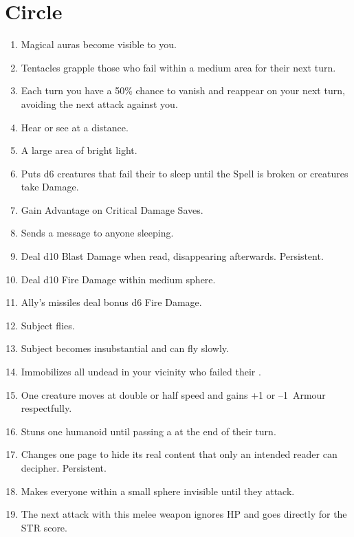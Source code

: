 \documentclass[itdr]{subfiles}
\begin{document}
\section{ Circle}
\begin{enumerate}
	\item {} Magical auras become visible to you.
	\item {} Tentacles grapple those who fail  within a medium area for their next turn.
	\item {} Each turn you have a 50\% chance to vanish and reappear on your next turn, avoiding the next attack against you.
	\item {} Hear or see at a distance.
	\item {} A large area of bright light.
	\item {} Puts d6 creatures that fail their  to sleep until the Spell is broken or creatures take Damage.
	\item {} Gain Advantage on Critical Damage Saves.
	\item {} Sends a message to anyone sleeping.
	\item {} Deal d10 Blast Damage when read, disappearing afterwards. Persistent.
	\item {} Deal d10 Fire Damage within medium sphere.
	\item {} Ally's missiles deal bonus d6 Fire Damage.
	\item {} Subject flies.
	\item {} Subject becomes insubstantial and can fly slowly.
	\item {} Immobilizes all undead in your vicinity who failed their .
	\item {} One creature moves at double or half speed and gains +1 or --1~Armour respectfully.
	\item {} Stuns one humanoid until passing a  at the end of their turn.
	\item {} Changes one page to hide its real content that only an intended reader can decipher. Persistent.
	\item {} Makes everyone within a small sphere invisible until they attack.
	\item {} The next attack with this melee weapon ignores HP and goes directly for the STR score.

\end{enumerate}
\end{document}
